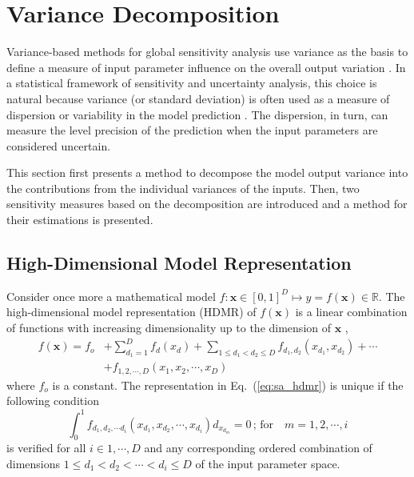 \section{Variance Decomposition}\label{sec:sa_variance_decomposition}

Variance-based methods for global sensitivity analysis use variance as the basis to define a measure of input parameter influence on the overall output variation \cite{Cacuci2004}.
In a statistical framework of sensitivity and uncertainty analysis, 
this choice is natural because variance (or standard deviation) is often used as a measure of dispersion or variability in the model prediction \cite{Saltelli2008}.
The  dispersion, in turn, can measure the level precision of the prediction when the input parameters are considered uncertain.

This section first presents a method to decompose the model output variance into the contributions from the individual variances of the inputs.
Then, two sensitivity measures based on the decomposition are introduced and a method for their estimations is presented.

\subsection{High-Dimensional Model Representation}\label{sub:sa_hdmr}

Consider once more a mathematical model $f: \bm{x} \in [0,1]^D \mapsto y = f(\bm{x}) \in \mathbb{R}$.
The high-dimensional model representation (HDMR) of $f(\bm{x})$ is a linear combination of functions with increasing dimensionality up to the dimension of $\bm{x}$ \cite{Li2001},
\begin{equation}
	\begin{split}
		f(\bm{x}) = f_o & + \sum_{d_1 = 1}^{D} f_d(x_d) + \sum_{1 \leq d_1 < d_2 \leq D} f_{d_1,d_2} (x_{d_1}, x_{d_2}) + \cdots  \\
	                      & + f_{1,2,\cdots,D} (x_1, x_2, \cdots, x_D)
	\end{split}
\label{eq:sa_hdmr}
\end{equation}
where $f_o$ is a constant.
The representation in Eq.~(\ref{eq:sa_hdmr}) is unique if the following condition \cite{Sobol2001}
\begin{equation}
    \int_{0}^{1} f_{d_1, d_2, \cdots d_i}(x_{d_1}, x_{d_2}, \cdots, x_{d_i}) d_{x_{d_m}} = 0 \,;
		\, \text{for}\quad m = 1,2,\cdots,i
\label{eq:sa_unicity}
\end{equation}
is verified for all $i \in {1, \cdots, D}$ and 
any corresponding ordered combination of dimensions $1 \leq d_1 < d_2 < \cdots < d_i \leq D$ of the input parameter space.

